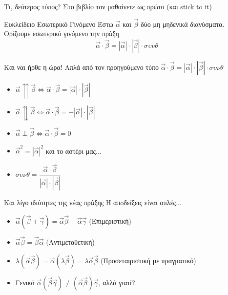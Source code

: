 \documentclass[greek]{beamer}
\begin{document}
\begin{frame}{Τι, δεύτερος τύπος?}
      Στο βιβλίο τον μαθαίνετε ως πρώτο (και stick to it)
      \begin{block}{Ευκλείδειο Εσωτερικό Γινόμενο}
            Έστω $\vec{α}$ και $\vec{β}$ δύο μη μηδενικά διανύσματα. Ορίζουμε εσωτερικό γινόμενο την πράξη
            $$\vec{α}\cdot\vec{β} = |\vec{α}|\cdot|\vec{β}|\cdot συνθ$$
      \end{block}

\end{frame}

\begin{frame}{Και ναι ήρθε η ώρα!}
      Απλά από τον προηγούμενο τύπο $\vec{α}\cdot\vec{β} = |\vec{α}|\cdot|\vec{β}|\cdot συνθ$
      \begin{itemize}
            \item<1-> $\vec{α}\upuparrows\vec{β}\iff \vec{α}\cdot\vec{β} = |\vec{α}|\cdot|\vec{β}|$
            \item<2-> $\vec{α}\updownarrows\vec{β}\iff \vec{α}\cdot\vec{β} = -|\vec{α}|\cdot|\vec{β}|$
            \item<3-> $\vec{α}\perp\vec{β}\iff \vec{α}\cdot\vec{β} = 0$
            \item<4-> $\vec{α}^2=|\vec{α}|^2$
                   {και το αστέρι μας...}
            \item<6-> $συνθ=\dfrac{\vec{α}\cdot\vec{β}}{|\vec{α}|\cdot|\vec{β}|}$
      \end{itemize}
\end{frame}

\begin{frame}{Και λίγο ιδιότητες της νέας πράξης}
      Η απoδείξεις είναι απλές...
      \begin{itemize}
            \item<1-> $\vec{α}(\vec{β}+\vec{γ})=\vec{α}\vec{β}+\vec{α}\vec{γ}$ (Επιμεριστική)
            \item<2-> $\vec{α}\vec{β}=\vec{β}\vec{α}$ (Αντιμεταθετική)
            \item<3-> $λ(\vec{α}\vec{β})=\vec{α}(λ\vec{β})=λ\vec{α}\vec{β}$ (Προσεταιριστική με πραγματικό)
            \item<4-> Γενικά $\vec{α}(\vec{β}\vec{γ})\ne (\vec{α}\vec{β})\vec{γ}$, αλλά γιατί?
      \end{itemize}
\end{frame}
\end{document}
